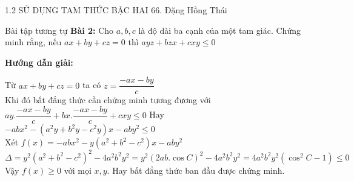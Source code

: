 \begin{frame}{1.2 SỬ DỤNG TAM THỨC BẬC HAI \hspace{3cm}  66. Đặng Hồng Thái} 
    \begin{block}{Bài tập tương tự}
        \textbf{Bài 2:} Cho $a,b,c$ là độ dài ba cạnh của một tam giác. Chứng minh rằng, nếu $ax+by+cz=0$ thì $ayz+bzx+cxy\leq0$
    \end{block} 
    \pause
    \begin{center}
        \textbf{Hướng dẫn giải:}
    \end{center}
        Từ $ax+by+cz=0$ ta có $z=\dfrac{-ax-by}{c}$ \\
        Khi đó bất đẳng thức cần chứng minh tương đương với \\
        \hspace{0,5cm} $ay.\dfrac{-ax-by}{c}+bx.\dfrac{-ax-by}{c}+cxy\leq0$ 
        Hay $-abx^2-(a^2y+b^2y-c^2y)x-aby^2\leq0$ \\
        Xét $f(x)=-abx^2-y(a^2+b^2-c^2)x-aby^2$ \\
        \vspace{0,2cm}
        \hspace{0,5cm} $\Delta = y^2(a^2+b^2-c^2)^2-4a^2b^2y^2
        = y^2 (2ab.\cos{C})^2-4a^2b^2y^2=4a^2b^2y^2(\cos^2{C}-1)\leq0$ \\
        \vspace{0,2cm}
        Vậy $f(x)\geq0$ với mọi $x,y$. 
        Hay bất đẳng thức ban đầu được chứng minh. 
\end{frame}


